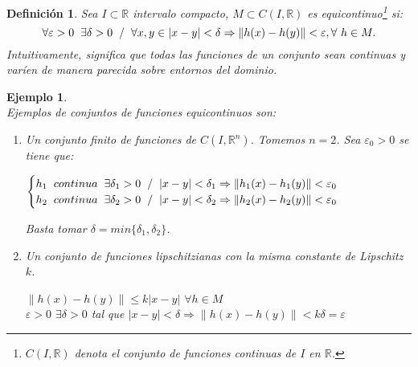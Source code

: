 \documentclass{article}
\providecommand{\norm}[1]{\lVert#1\rVert}
\theoremstyle{theorem-style}  %
\theoremstyle{definition-style}
\newtheorem{definition}{Definición}[section]
\theoremstyle{example-style}
\newtheorem{example}{Ejemplo}[section]
\begin{document}
\begin{definition}
	Sea $I \subset \mathbb{R}$ intervalo compacto, $M \subset C(I, \mathbb{R})$ es \emph{equicontinuo}\footnote{ $ C(I, \mathbb{R})$ denota el conjunto de funciones continuas de $ I $ en $ \mathbb{R} $.} si:
	\[\forall \varepsilon > 0 \hspace{0,2cm} \exists \delta > 0 \hspace{0,2cm} / \hspace{0,2cm} \forall x, y\in |x-y| < \delta \Rightarrow \norm{h(x) - h(y)} < \varepsilon, \forall \ h \in M.\]
	Intuitivamente, significa que todas las funciones de un conjunto sean continuas y varíen de manera parecida sobre entornos del dominio.
\end{definition}
\begin{example} \ \\
	Ejemplos de conjuntos de funciones equicontinuos son:
	\begin{enumerate}
		\item Un conjunto finito de funciones de $C(I, \mathbb{R}^n)$. Tomemos $n = 2$. Sea $\varepsilon_0 > 0$ se tiene que:
		\begin{center}
			$\begin{cases}
			h_1 \hspace{0,2cm} continua \hspace{0,2cm} \exists \delta_1 > 0 \hspace{0,2cm} / \hspace{0,2cm} |x-y|<\delta_1 \Rightarrow \norm{h_1(x) - h_1(y)} < \varepsilon_0 \\
			h_2 \hspace{0,2cm} continua \hspace{0,2cm} \exists \delta_2 > 0 \hspace{0,2cm} / \hspace{0,2cm} |x-y|<\delta_2 \Rightarrow \norm{h_2(x) - h_2(y)} < \varepsilon_0
			\end{cases}$
		\end{center}
		Basta tomar $\delta = min\{\delta_1, \delta_2\}$.
		\item Un conjunto de funciones lipschitzianas con la misma constante de Lipschitz $k$.
		\begin{center}
			$\norm{h(x) - h(y)}\leq k|x-y|$ $\forall h \in M$ \\
			$\varepsilon > 0$ $\exists \delta > 0$ tal que $|x-y|<\delta \Rightarrow \norm{h(x) - h(y)} < k\delta = \varepsilon$
		\end{center}
	\end{enumerate}
\end{example}
\end{document}
